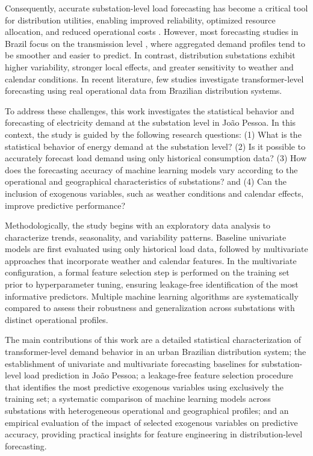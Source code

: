 Consequently, accurate substation-level load forecasting has become a critical tool for distribution utilities, enabling improved reliability, optimized resource allocation, and reduced operational costs \cite{AHMAD2022112128}. However, most forecasting studies in Brazil focus on the transmission level \cite{Aquila2023}, where aggregated demand profiles tend to be smoother and easier to predict. In contrast, distribution substations exhibit higher variability, stronger local effects, and greater sensitivity to weather and calendar conditions. In recent literature, few studies investigate transformer-level forecasting using real operational data from Brazilian distribution systems.

To address these challenges, this work investigates the statistical behavior and forecasting of electricity demand at the substation level in João Pessoa. In this context, the study is guided by the following research questions: 
(1) What is the statistical behavior of energy demand at the substation level? 
(2) Is it possible to accurately forecast load demand using only historical consumption data? 
(3) How does the forecasting accuracy of machine learning models vary according to the operational and geographical characteristics of substations? 
and (4) Can the inclusion of exogenous variables, such as weather conditions and calendar effects, improve predictive performance?

Methodologically, the study begins with an exploratory data analysis to characterize trends, seasonality, and variability patterns. Baseline univariate models are first evaluated using only historical load data, followed by multivariate approaches that incorporate weather and calendar features. In the multivariate configuration, a formal feature selection step is performed on the training set prior to hyperparameter tuning, ensuring leakage-free identification of the most informative predictors. Multiple machine learning algorithms are systematically compared to assess their robustness and generalization across substations with distinct operational profiles.

The main contributions of this work are a detailed statistical characterization of transformer-level demand behavior in an urban Brazilian distribution system; the establishment of univariate and multivariate forecasting baselines for substation-level load prediction in João Pessoa; a leakage-free feature selection procedure that identifies the most predictive exogenous variables using exclusively the training set; a systematic comparison of machine learning models across substations with heterogeneous operational and geographical profiles; and an empirical evaluation of the impact of selected exogenous variables on predictive accuracy, providing practical insights for feature engineering in distribution-level forecasting.

